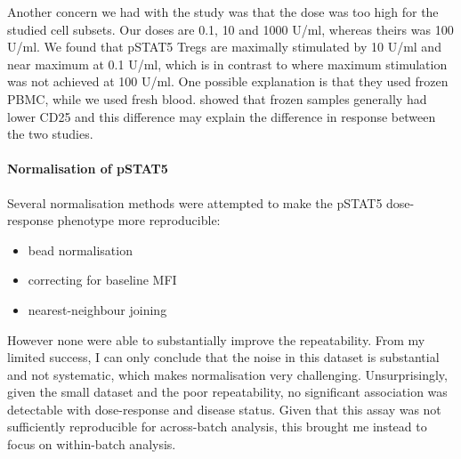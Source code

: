 
Another concern we had with the \citet{Long:2010ej} study was that the dose was too high for the studied cell subsets.
Our doses are 0.1, 10 and 1000 U/ml, whereas theirs was 100 U/ml.
We found that pSTAT5 Tregs are maximally stimulated by 10 U/ml and near maximum at 0.1 U/ml,
which is in contrast to \citet{Long:2010ej} where maximum stimulation was not achieved at 100 U/ml.
One possible explanation is that they used frozen \gls{PBMC}, while we used fresh blood.
\cite{Dendrou:2009dv} showed that frozen samples generally had lower CD25 and this difference may explain the difference in response between the two studies.



\paragraph{Normalisation of pSTAT5}

Several normalisation methods were attempted to make the pSTAT5 dose-response phenotype more reproducible:
\begin{itemize}[noitemsep,topsep=0pt,parsep=0pt,partopsep=0pt]
    \item bead normalisation
    \item correcting for baseline MFI
    \item nearest-neighbour joining
\end{itemize}
However none were able to substantially improve the repeatability.
From my limited success, I can only conclude that the noise in this dataset is substantial and not systematic, which makes normalisation very challenging.
Unsurprisingly, given the small dataset and the poor repeatability, no significant association was detectable with dose-response and disease status.
Given that this assay was not sufficiently reproducible for across-batch analysis, this brought me instead to focus on within-batch analysis.


